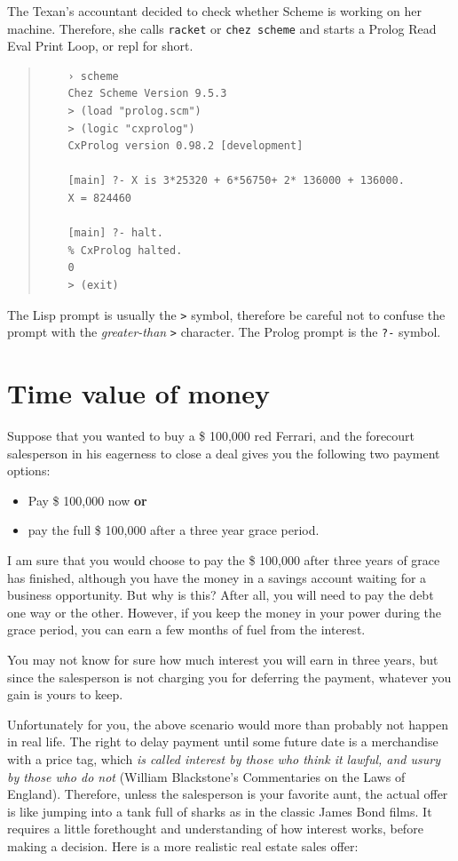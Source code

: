 \documentclass[a4paper,12pt]{book}
\begin{document}
The Texan's accountant decided to check whether
Scheme is working on her machine. Therefore,
she calls \verb|racket| or \verb|chez scheme| and
starts a Prolog Read Eval Print Loop, or repl for
short.
\begin{quote}
	\begin{verbatim}
	› scheme
	Chez Scheme Version 9.5.3
	> (load "prolog.scm")
	> (logic "cxprolog")
	CxProlog version 0.98.2 [development]

	[main] ?- X is 3*25320 + 6*56750+ 2* 136000 + 136000.
	X = 824460

	[main] ?- halt.
	% CxProlog halted.
	0
	> (exit)
	\end{verbatim}
\end{quote}

The Lisp prompt is usually the \verb|>| symbol,
therefore be careful not to confuse the prompt
with the {\em greater-than} \verb|>| character.
The Prolog prompt is the \verb|?-| symbol.

\section{Time value of money}
Suppose that you wanted to buy a \$ 100,000 red Ferrari,
and the forecourt salesperson in his eagerness to
close a deal gives you the following two payment options:  
\begin{itemize}
	\item Pay \$ 100,000 now {\bf or}
	\item pay the full \$ 100,000 after a three year grace period.
\end{itemize}

I am sure that you would choose to pay the \$ 100,000 after
three years of grace has finished, although you have the
money in a savings account waiting for a business
opportunity. But why is this? After all, you will need
to pay the debt one way or the other. However, if you
keep the money in your power during the grace period,
you can earn a few months of fuel from the interest.

You may not know for sure how much interest you
will earn in three years, but since the salesperson
is not charging you for deferring the payment,
whatever you gain is yours to keep.

Unfortunately for you, the above scenario would
more than probably not happen in real life.
The right to delay payment until some future
date is a merchandise with a price tag,
which {\em is called interest by those who
think it lawful, and usury by those who
do not} (William Blackstone's Commentaries
on the Laws of England). Therefore, unless
the salesperson is your favorite aunt,
the actual offer is like jumping into a tank
full of sharks as in the classic James Bond films.
It requires a little forethought and understanding
of how interest works, before making a decision.
Here is a more realistic real estate sales offer:
\end{document}
